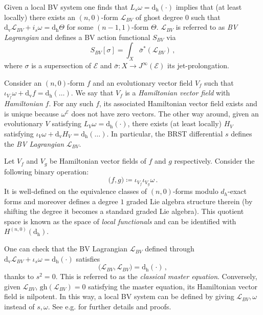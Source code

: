 \documentclass[a4paper,12pt]{article}
\numberwithin{equation}{section} %
\newcommand{\gh}[1]{\mathrm{gh}(#1)}
\newcommand{\dv}{\mathrm{d_v}}
\renewcommand{\dh}{\mathrm{d_h}}
\newcommand{\ab}[2]{\big(#1,#2\big)}
\def\cE{\mathcal{E}}
\def\cL{\mathcal{L}}
\begin{document}
Given a local BV system one finds that $L_s\omega=\dh(\cdot)$ implies that (at least locally) there exists an $(n,0)$-form $\cL_{BV}$ of ghost degree $0$ such that $\dv \cL_{BV}+ i_s \omega=\dh \Theta$  for some $(n-1,1)$-form $\Theta$. $\cL_{BV}$ is referred to as \textit{BV Lagrangian} and defines a BV action functional $S_{BV}$ via
\begin{equation}
S_{BV}[\sigma]=\int_X \bar\sigma^*(\cL_{BV})\,,
\end{equation}
where $\sigma$ is a supersection of $\cE$ and $\bar\sigma: X \to J^\infty(\cE)$ its jet-prolongation.


Consider an $(n,0)$-form $f$ and an evolutionary vector field $V_f$ such that $\iota_{V_f}\omega +\dv f = \dh(\dots)$. We say that $V_f$ is a \textit{Hamiltonian vector field} with \textit{Hamiltonian} $f$. For any such $f$, its associated Hamiltonian vector field exists and is unique because $\omega^\cE$ does not have zero vectors. The other way around, given an evolutionary $V$ satisfying $L_V\omega=\dh(\cdot)$, there exists (at least locally)  $H_V$ satisfying $\iota_{V}\omega +\dv H_V = \dh(\dots)$. In particular, the BRST differential $s$ defines the \textit{BV Lagrangian} $\cL_{BV}$. 


Let $V_f$ and $V_g$ be Hamiltonian vector fields of $f$ and $g$ respectively. Consider the following binary operation:
\begin{equation}
	\ab{f}{g} \coloneqq \iota_{V_f}\iota_{V_g}\omega\,.
\end{equation}
It is well-defined on the equivalence classes of $(n,0)$-forms modulo $d_h$-exact forms and moreover defines a degree $1$
graded Lie algebra structure therein (by shifting the degree it becomes a standard graded Lie algebra). This quotient space is known as the space of \textit{local functionals} and can be identified with $H^{(n,0)}(\dh)$.

One can check that the BV Lagrangian $\cL_{BV}$ defined through $\dv \cL_{BV}+\iota_s\omega=\dh(\cdot)$ satisfies
\begin{equation}
\ab{\cL_{BV}}{\cL_{BV}} = \dh(\cdot)\,,
\end{equation}
thanks to $s^2=0$. This is referred to as the \textit{classical master equation}. Conversely, given $\cL_{BV}$, $\gh{\cL_{BV}}=0$ satisfying the master equation, its Hamiltonian vector field is nilpotent. In this way, a local BV system can be defined by giving $\cL_{BV},\omega$ instead of $s,\omega$. See e.g. \cite{Sharapov:2016sgx,Grigoriev:2022zlq} for further details and proofs.
\end{document}
